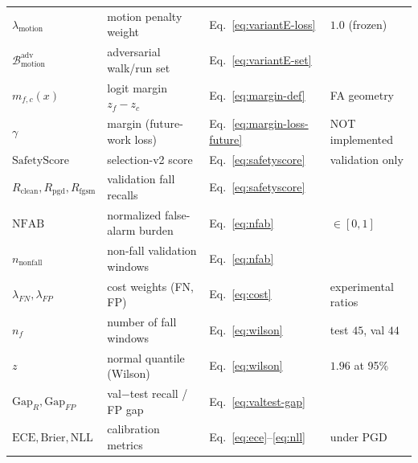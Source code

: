 \begin{table}[t]
\begin{tabular}{l l l l}
    $\lambda_{\mathrm{motion}}$ & motion penalty weight & Eq.~\ref{eq:variantE-loss} & $1.0$ (frozen) \\
    $\mathcal{B}^{\mathrm{adv}}_{\mathrm{motion}}$ & adversarial walk/run set & Eq.~\ref{eq:variantE-set} & \\
    $m_{f,c}(x)$ & logit margin $z_f-z_c$ & Eq.~\ref{eq:margin-def} & FA geometry \\
    $\gamma$ & margin (future-work loss) & Eq.~\ref{eq:margin-loss-future} & NOT implemented \\
    $\mathrm{SafetyScore}$ & selection-v2 score & Eq.~\ref{eq:safetyscore} & validation only \\
    $R_{\mathrm{clean}},R_{\mathrm{pgd}},R_{\mathrm{fgsm}}$ & validation fall recalls & Eq.~\ref{eq:safetyscore} & \\
    $\mathrm{NFAB}$ & normalized false-alarm burden & Eq.~\ref{eq:nfab} & $\in[0,1]$ \\
    $n_{\mathrm{nonfall}}$ & non-fall validation windows & Eq.~\ref{eq:nfab} & \\
    $\lambda_{FN},\lambda_{FP}$ & cost weights (FN, FP) & Eq.~\ref{eq:cost} & experimental ratios \\
    $n_f$ & number of fall windows & Eq.~\ref{eq:wilson} & test $45$, val $44$ \\
    $z$ & normal quantile (Wilson) & Eq.~\ref{eq:wilson} & $1.96$ at 95\% \\
    $\mathrm{Gap}_R,\mathrm{Gap}_{FP}$ & val$-$test recall / FP gap & Eq.~\ref{eq:valtest-gap} & \\
    $\mathrm{ECE},\mathrm{Brier},\mathrm{NLL}$ & calibration metrics & Eq.~\ref{eq:ece}--\ref{eq:nll} & under PGD \\
    \bottomrule
  \end{tabular}
\end{table}
